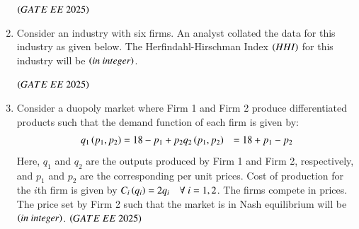 \documentclass[journal,12pt,onecolumn]{IEEEtran}
\theoremstyle{remark}
\begin{document}
\begin{enumerate}
\begin{table}[H]
\centering

\end{table}
 \hfill $\left(GATE\ EE\ 2025\right)$
\item Consider an industry with six firms. An analyst collated the data for this industry as given below. The Herfindahl-Hirschman Index $\left(HHI\right)$ for this industry will be \underline{\hspace{2cm}} $\left(in\ integer\right)$.
\begin{table}[H]
\centering

\end{table} 
 \hfill $\left(GATE\ EE\ 2025\right)$
\item Consider a duopoly market where Firm 1 and Firm 2 produce differentiated products such that the demand function of each firm is given by:
\begin{align*}
q_1\left(p_1, p_2\right) &= 18 - p_1 + p_2  
q_2\left(p_1, p_2\right) &= 18 + p_1 - p_2
\end{align*}
Here, $q_1$ and $q_2$ are the outputs produced by Firm 1 and Firm 2, respectively, and $p_1$ and $p_2$ are the corresponding per unit prices. Cost of production for the $i$th firm is given by $C_i\left(q_i\right) = 2q_i \quad \forall~i=1,2$. The firms compete in prices. The price set by Firm 2 such that the market is in Nash equilibrium will be \underline{\hspace{2cm}} $\left(in\ integer\right)$. 
 \hfill $\left(GATE\ EE\ 2025\right)$
\end{enumerate}
\renewcommand{\thefigure}{\theenumi}
\renewcommand{\thetable}{\theenumi}
\end{document}
